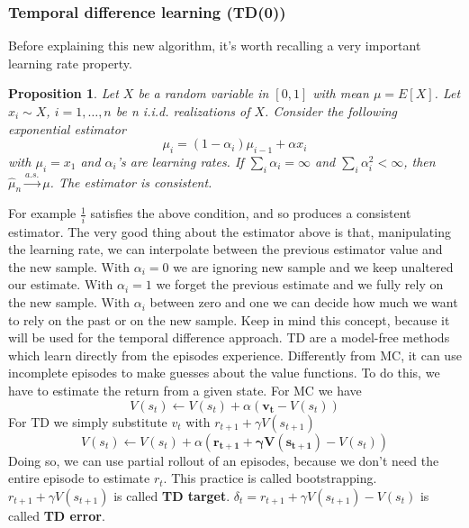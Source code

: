 \documentclass[main.tex]{subfiles}
\newtheorem{proposition}{Proposition}[section]
\begin{document}
\subsubsection{Temporal difference learning (TD(0))}
Before explaining this new algorithm, it's worth recalling a very important learning rate property.
\begin{proposition}
    Let $X$ be a random variable in $[0, 1]$ with mean $\mu = E[X]$. Let $x_i \sim X$, $i=1,\dots,n$ be n i.i.d. realizations of $X$.
    Consider the following exponential estimator
    \begin{equation*}
        \mu_i = (1-\alpha_i) \mu_{i-1} + \alpha x_i
    \end{equation*}
    with $\mu_i=x_1$ and $\alpha_i$'s are learning rates.
    \newline
    If $\sum_i \alpha_i = \infty$ and $\sum_i \alpha_i^2 < \infty$, then $\hat{\mu}_n \overset{a.s.}{\rightarrow} \mu$. The estimator is consistent.
\end{proposition}
For example $\frac{1}{i}$ satisfies the above condition, and so produces a consistent estimator.
The very good thing about the estimator above is that, manipulating the learning rate, we can interpolate between the previous estimator value and the new sample. With $\alpha_i=0$ we are ignoring new sample and we keep unaltered our estimate. With $\alpha_i = 1$ we forget the previous estimate and we fully rely on the new sample. With $\alpha_i$ between zero and one we can decide how much we want to rely on the past or on the new sample. Keep in mind this concept, because it will be used for the temporal difference approach.
TD are a model-free methods which learn directly from the episodes experience. Differently from MC, it can use incomplete episodes to make guesses about the value functions. To do this, we have to estimate the return from a given state. For MC we have
\begin{equation*}
    V(s_t) \leftarrow V(s_t) + \alpha(\mathbf{v_t}-V(s_t))
\end{equation*}
For TD we simply substitute $v_t$ with $r_{t+1} + \gamma V(s_{t+1})$
\begin{equation*}
    V(s_t) \leftarrow V(s_t) + \alpha(\mathbf{r_{t+1} + \gamma V(s_{t+1})}-V(s_t))
\end{equation*}
Doing so, we can use partial rollout of an episodes, because we don't need the entire episode to estimate $r_t$. This practice is called bootstrapping. $r_{t+1} + \gamma V(s_{t+1})$ is called \textbf{TD target}. $\delta_t = r_{t+1} + \gamma V(s_{t+1}) - V(s_t)$ is called \textbf{TD error}.
\end{document}
